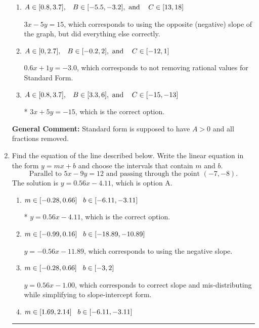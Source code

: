 \documentclass{extbook}[14pt]
\newcommand{\litem}[1]{\item #1

\rule{\textwidth}{0.4pt}}
\begin{document}
\begin{enumerate}
{\begin{enumerate}[label=\Alph*.]
 $-3x - 5y = 15$, which corresponds to not making $A$ positive (by multiplying the equation by $-1$).
\item \( A \in [0.8, 3.7], \hspace{3mm} B \in [-5.5, -3.2], \text{ and } \hspace{3mm} C \in [13, 18] \)

 $3x - 5y = 15$, which corresponds to using the opposite (negative) slope of the graph, but did everything else correctly.
\item \( A \in [0, 2.7], \hspace{3mm} B \in [-0.2, 2], \text{ and } \hspace{3mm} C \in [-12, 1] \)

 $0.6x + 1y = -3.0$, which corresponds to not removing rational values for Standard Form.
\item \( A \in [0.8, 3.7], \hspace{3mm} B \in [3.3, 6], \text{ and } \hspace{3mm} C \in [-15, -13] \)

* $3x + 5y = -15$, which is the correct option.
\end{enumerate}

\textbf{General Comment:} Standard form is supposed to have $A > 0$ and all fractions removed.
}
\litem{
Find the equation of the line described below. Write the linear equation in the form $ y=mx+b $ and choose the intervals that contain $m$ and $b$.
\[ \text{Parallel to } 5 x - 9 y = 12 \text{ and passing through the point } (-7, -8). \]The solution is \( y = 0.56x - 4.11 \), which is option A.\begin{enumerate}[label=\Alph*.]
\item \( m \in [-0.28, 0.66] \hspace*{3mm} b \in [-6.11, -3.11] \)

* $y = 0.56x - 4.11$, which is the correct option.
\item \( m \in [-0.99, 0.16] \hspace*{3mm} b \in [-18.89, -10.89] \)

 $y = -0.56x - 11.89$, which corresponds to using the negative slope.
\item \( m \in [-0.28, 0.66] \hspace*{3mm} b \in [-3, 2] \)

 $y = 0.56x - 1.00$, which corresponds to correct slope and mis-distributing while simplifying to slope-intercept form.
\item \( m \in [1.69, 2.14] \hspace*{3mm} b \in [-6.11, -3.11] \)


\end{enumerate}}
\end{enumerate}
\end{document}
